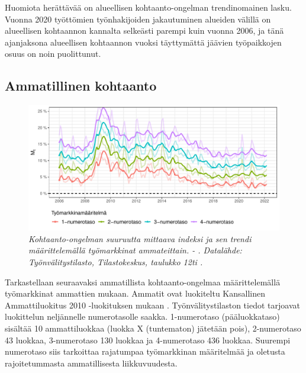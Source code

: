 \documentclass[12pt]{article}
\newcommand{\lastdatamonth}{\unskip}
\newcommand{\firstdatamonth}{\unskip}
\newcommand{\newcaption}[1]{\caption{\textit{\footnotesize{#1}}}}
\begin{document}
Huomiota herättävää on alueellisen kohtaanto-ongelman trendinomainen lasku. Vuonna 2020 työttömien työnhakijoiden jakautuminen alueiden välillä on alueellisen kohtaannon kannalta selkeästi parempi kuin vuonna 2006, ja tänä ajanjaksona alueellisen kohtaannon vuoksi täyttymättä jäävien työpaikkojen osuus on noin puolittunut.

\subsection{Ammatillinen kohtaanto} \label{section:ammatillinen_kohtaanto}


\begin{figure}
\centering
\includegraphics[scale = 0.8]{../kuviot/indeksi_ammateittain.pdf}
    \newcaption{Kohtaanto-ongelman suuruutta mittaava indeksi ja sen trendi määrittelemällä työmarkkinat ammateittain. \protect \firstdatamonth \phantom{} - \protect\lastdatamonth. Datalähde: Työnvälitystilasto, Tilastokeskus, taulukko 12ti \protect \cite{svt2011}.}
   \label{fig:kd982}
\end{figure}

Tarkastellaan seuraavaksi ammatillista kohtaanto-ongelmaa määrittelemällä työmarkkinat ammattien mukaan. Ammatit ovat luokiteltu Kansallinen Ammattiluokitus 2010 -luokituksen mukaan \cite{tilastokeskus2011ammattiluokitus}. Työnvälitystilaston tiedot tarjoavat luokittelun neljännelle numerotasolle saakka. 1-numerotaso (pääluokkataso) sisältää 10 ammattiluokkaa (luokka X (tuntematon) jätetään pois), 2-numerotaso 43 luokkaa, 3-numerotaso 130 luokkaa ja 4-numerotaso 436 luokkaa. Suurempi numerotaso siis tarkoittaa rajatumpaa työmarkkinan määritelmää ja oletusta rajoitetummasta ammatillisesta liikkuvuudesta. 
\end{document}
